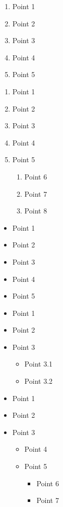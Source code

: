 \begin{enumerate}[label=(\arabic*).]
    \item Point 1
    \item Point 2
    \item Point 3
    \item Point 4
    \item Point 5
\end{enumerate}



\begin{enumerate}
    \item Point 1
    \item Point 2
    \item Point 3
    \item Point 4
    \item Point 5
    \begin{enumerate}
        \item Point 6
        \item Point 7
        \item Point 8
    \end{enumerate}
\end{enumerate}




\begin{itemize}
    \item Point 1
    \item Point 2
    \item Point 3
    \item Point 4
    \item Point 5
\end{itemize}


\begin{itemize}
    \item Point 1
    \item Point 2
    \item Point 3
    \begin{itemize}
        \item Point 3.1
        \item Point 3.2
    \end{itemize}
\end{itemize}


\begin{itemize}
    \item Point 1
    \item Point 2
    \item Point 3
    \begin{itemize}
        \item Point 4
        \item Point 5
        \begin{itemize}
            \item Point 6
            \item Point 7
        \end{itemize}
    \end{itemize}
\end{itemize}


